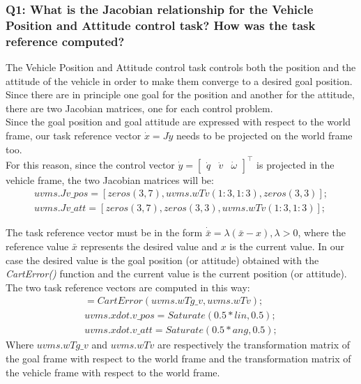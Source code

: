 \documentclass{article}
\begin{document}
\subsubsection{Q1: What is the Jacobian relationship for the Vehicle Position and Attitude control task? How was the task reference computed?}

The Vehicle Position and Attitude control task controls both the position and the attitude of the vehicle in order to make them converge to a desired goal position. Since there are in principle one goal for the position and another for the attitude, there are two Jacobian matrices, one for each control problem. \\
Since the goal position and goal attitude are expressed with respect to the world frame, our task reference vector $ \dot{x} = J\dot{y} $ needs to be projected on the world frame too. \\
For this reason, since the control vector $ \dot{y} = \begin{bmatrix} \dot{q} & \dot{v} & \dot{\omega}\end{bmatrix}^\top $ is projected in the vehicle frame, the two Jacobian matrices will be:
\begin{gather*}
uvms.Jv\_pos = [zeros(3, 7), uvms.wTv(1:3, 1:3), zeros(3,3)]; \\
uvms.Jv\_att = [zeros(3, 7), zeros(3, 3), uvms.wTv(1:3, 1:3)];
\end{gather*}

The task reference vector must be in the form $ \dot{\bar{x}} = \lambda(\bar{x} - x), \lambda > 0 $, where the reference value $ \bar{x} $ represents the desired value and $ x $ is the current value. In our case the desired value is the goal position (or attitude) obtained with the \textit{CartError()} function and the current value is the current position (or attitude). \\
The two task reference vectors are computed in this way:
\begin{gather*}
[ang, lin] = CartError(uvms.wTg\_v , uvms.wTv); \\
uvms.xdot.v\_pos = Saturate(0.5 * lin, 0.5); \\
uvms.xdot.v\_att = Saturate(0.5 * ang, 0.5);
\end{gather*}
Where $ uvms.wTg\_v $ and $ uvms.wTv $ are respectively the transformation matrix of the goal frame with respect to the world frame and the transformation matrix of the vehicle frame with respect to the world frame. 
\end{document}
